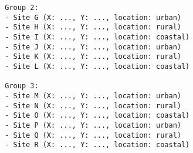 \documentclass{article}
\begin{document}
\begin{itemize}
\begin{verbatim}
		Group 2:
		- Site G (X: ..., Y: ..., location: urban)
		- Site H (X: ..., Y: ..., location: rural)
		- Site I (X: ..., Y: ..., location: coastal)
		- Site J (X: ..., Y: ..., location: urban)
		- Site K (X: ..., Y: ..., location: rural)
		- Site L (X: ..., Y: ..., location: coastal)
		
		Group 3:
		- Site M (X: ..., Y: ..., location: urban)
		- Site N (X: ..., Y: ..., location: rural)
		- Site O (X: ..., Y: ..., location: coastal)
		- Site P (X: ..., Y: ..., location: urban)
		- Site Q (X: ..., Y: ..., location: rural)
		- Site R (X: ..., Y: ..., location: coastal)
	\end{verbatim}
\end{itemize}

	
\end{document}
